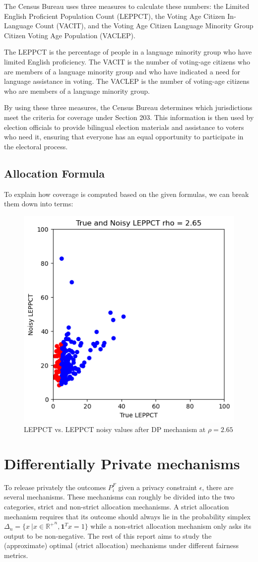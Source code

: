 \documentclass[9pt,twocolumn,twoside,lineno]{pnas-new}
\begin{document}
The Census Bureau uses three measures to calculate these numbers: the Limited English Proficient Population Count (LEPPCT), the Voting Age Citizen In-Language Count (VACIT), and the Voting Age Citizen Language Minority Group Citizen Voting Age Population (VACLEP).

The LEPPCT is the percentage of people in a language minority group who have limited English proficiency. The VACIT is the number of voting-age citizens who are members of a language minority group and who have indicated a need for language assistance in voting. The VACLEP is the number of voting-age citizens who are members of a language minority group.

By using these three measures, the Census Bureau determines which jurisdictions meet the criteria for coverage under Section 203. This information is then used by election officials to provide bilingual election materials and assistance to voters who need it, ensuring that everyone has an equal opportunity to participate in the electoral process.

\subsection*{Allocation Formula}
To explain how coverage is computed based on the given formulas, we can break them down into terms:
\begin{figure}[h]
\centering
\includegraphics[width=0.5\linewidth]{images/true_noisy_leppct_2.65.png}
\caption{LEPPCT vs. LEPPCT noisy values after DP mechanism at $\rho=2.65$}
\label{fig:state_alpha}
\end{figure}



\section*{Differentially Private mechanisms}
To release privately the outcomes $P^F_i$ given a privacy constraint $\epsilon$, there are several mechanisms. These mechanisms can roughly be divided into the two categories, strict and non-strict allocation mechanisms. A strict allocation mechanism requires that
its outcome should always lie in the probability simplex $\Delta_n = \{x \  | x \in {\mathbb{R}^{+}}^{n}, \boldsymbol{1}^T x =1 \}$ while a non-strict allocation mechanism
only asks its output to be non-negative. The rest of this report aims to study the (approximate) optimal
(strict allocation) mechanisms under different fairness metrics.
\end{document}
